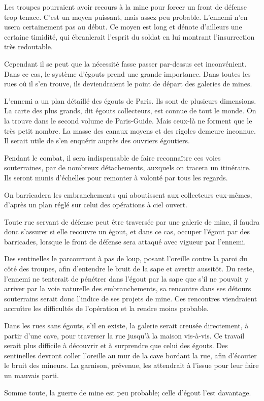 \documentclass[french,twoside]{book} %
\begin{document}
\noindent Les troupes pourraient avoir recours à la mine pour forcer un front de défense trop tenace. C'est un moyen puissant, mais assez peu probable. L'ennemi n’en usera certainement pas au début. Ce moyen est long et dénote d’ailleurs une certaine timidité, qui ébranlerait l’esprit du soldat en lui montrant l’insurrection très redoutable.\par
Cependant il se peut que la nécessité fasse passer par-dessus cet inconvénient. Dans ce cas, le système d’égouts prend une grande importance. Dans toutes les rues où il s’en trouve, ils deviendraient le point de départ des galeries de mines.\par
L'ennemi a un plan détaillé des égouts de Paris. Ils sont de plusieurs dimensions. La carte des plus grands, dit égouts collecteurs, est connue de tout le monde. On la trouve dans le second volume de Paris-Guide. Mais ceux-là ne forment que le très petit nombre. La masse des canaux moyens et des rigoles demeure inconnue. Il serait utile de s’en enquérir auprès des ouvriers égoutiers.\par
Pendant le combat, il sera indispensable de faire reconnaître ces voies souterraines, par de nombreux détachements, auxquels on tracera un itinéraire. Ils seront munis d’échelles pour remonter à volonté par tous les regards.\par
On barricadera les embranchements qui aboutissent aux collecteurs eux-mêmes, d’après un plan réglé sur celui des opérations à ciel ouvert.\par
Toute rue servant de défense peut être traversée par une galerie de mine, il faudra donc s’assurer si elle recouvre un égout, et dans ce cas, occuper l’égout par des barricades, lorsque le front de défense sera attaqué avec vigueur par l’ennemi.\par
Des sentinelles le parcourront à pas de loup, posant l’oreille contre la paroi du côté des troupes, afin d’entendre le bruit de la sape et avertir aussitôt. Du reste, l’ennemi ne tenterait de pénétrer dans l’égout par la sape que s’il ne pouvait y arriver par la voie naturelle des embranchements, sa rencontre dans ses détours souterrains serait donc l’indice de ses projets de mine. Ces rencontres viendraient accroître les difficultés de l’opération et la rendre moins probable.\par
Dans les rues sans égouts, s’il en existe, la galerie serait creusée directement, à partir d’une cave, pour traverser la rue jusqu’à la maison vis-à-vis. Ce travail serait plus difficile à découvrir et à surprendre que celui des égouts. Des sentinelles devront coller l’oreille au mur de la cave bordant la rue, afin d’écouter le bruit des mineurs. La garnison, prévenue, les attendrait à l’issue pour leur faire un mauvais parti.\par
Somme toute, la guerre de mine est peu probable; celle d’égout l’est davantage.
\end{document}
